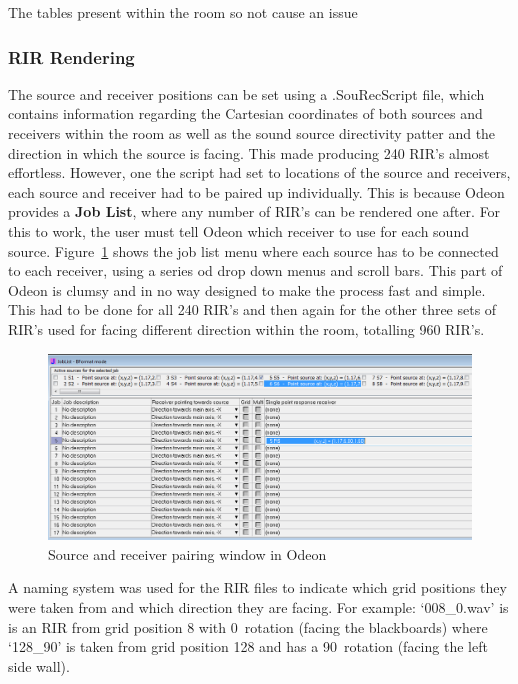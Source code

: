 \documentclass[../../main.tex]{subfiles}
\begin{document}
			The tables present within the room so not cause an issue 

		\subsubsection{RIR Rendering}

			The source and receiver positions can be set using a .SouRecScript file, which contains information regarding the Cartesian coordinates of both sources and receivers within the room as well as the sound source directivity patter and the direction in which the source is facing. This made producing 240 \ac{RIR}'s almost effortless. However, one the script had set to locations of the source and receivers, each source and receiver had to be paired up individually. This is because Odeon provides a \textbf{Job List}, where any number of \ac{RIR}'s can be rendered one after. For this to work, the user must tell Odeon which receiver to use for each sound source. Figure~\ref{SouRecPos} shows the job list menu where each source has to be connected to each receiver, using a series od drop down menus and scroll bars. This part of Odeon is clumsy and in no way designed to make the process fast and simple. This had to be done for all 240 \ac{RIR}'s and then again for the other three sets of \ac{RIR}'s used for facing different direction within the room, totalling 960 \ac{RIR}'s.

			\begin{figure}[H]
				\centerline{\includegraphics[scale = 0.4]{Sections/Implementation/Odeon/images/SouRecPos/SouRecSelection_crop.png}}
				\caption{Source and receiver pairing window in Odeon}
				\label{SouRecPos}
			\end{figure}

			A naming system was used for the \ac{RIR} files to indicate which grid positions they were taken from and which direction they are facing. For example: `008\_0.wav' is is an \ac{RIR} from grid position 8 with 0\textdegree~rotation (facing the blackboards) where `128\_90' is taken from grid position 128 and has a 90\textdegree~rotation (facing the left side wall).
\end{document}
